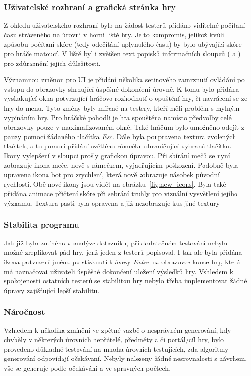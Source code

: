 \subsubsection*{\textbullet Uživatelské rozhraní a grafická stránka hry}
Z ohledu uživatelského rozhraní bylo na žádost testerů přidáno viditelné počítaní času stráveného na úrovní v horní liště hry. Je to kompromis, jelikož kvůli způsobu počítaní skóre (tedy odečítání uplynulého času) by bylo ubývající skóre pro hráče matoucí. V liště byl i zvětšen text popisků informačních sloupců ( a ) pro zdůraznění jejich důležitosti.

Významnou změnou pro UI je přidání několika setinového zamrznutí ovládání po vstupu do obrazovky shrnující úspěšné dokončení úrovně. K tomu bylo přidána vyskakující okna potvrzující hráčovo rozhodnutí o opuštění hry, či navrácení se ze hry do menu. Tyto změny byly mířené na testery, kteří měli problém s mylným vypínáním hry. Pro hráčské pohodlí je hra spouštěna namísto předvolby celé obrazovky pouze v maximalizovaném okně. Také hráčům bylo umožněno odejít z pauzy pomocí žádaného tlačítka \textit{Esc}. Dále byla poupravena textura zvolených tlačítek, a to pomocí přidání světlého rámečku ohraničující vybrané tlačítko.
Ikony vylepšení v sloupci  prošly grafickou úpravou. Při sbírání mečů se nyní zobrazuje ikona meče, nově s rámečkem, vyjadřujícím poškození. Podobně byla upravena ikona bot pro zrychlení, která nově zobrazuje násobek původní rychlosti. Obě nové ikony jsou vidět na obrázku~\ref{fig:new_icons}. Byla také přidána animace přičtení skóre při sebrání truhly pro vizuální vysvětlení jejího významu. Textura pasti byla opravena a již nezobrazuje kus jiné textury.

\subsubsection*{\textbullet Stabilita programu}
Jak již bylo zmíněno v analýze dotazníku, při dodatečném testování nebylo možné zreplikovat pád hry, jenž jeden z testerů popisoval. I tak ale byla přidána ikona potvrzení jména po stisknutí klávesy \textit{Enter} na obrazovce konce hry, která má naznačovat uživateli úspěšné dokončení uložení výsledků hry. Vzhledem k spokojenosti ostatních testerů se stabilitou hry nebylo třeba implementovat žádné úpravy zajišťující lepší stabilitu.

\subsubsection*{\textbullet Náročnost}
Vzhledem k několika zmínění ve zpětné vazbě o nesprávném generování, kdy chyběly v některých úrovních nepřátelé, předměty a či portál/cíl hry, bylo provedeno důkladné testování na mnoha úrovních testujících, zda algoritmy generování odpovídají očekávaní. Nebyly nalezeny žádné nesrovnalosti s návrhem, vše se generuje podle očekávání a ve správných počtech.

